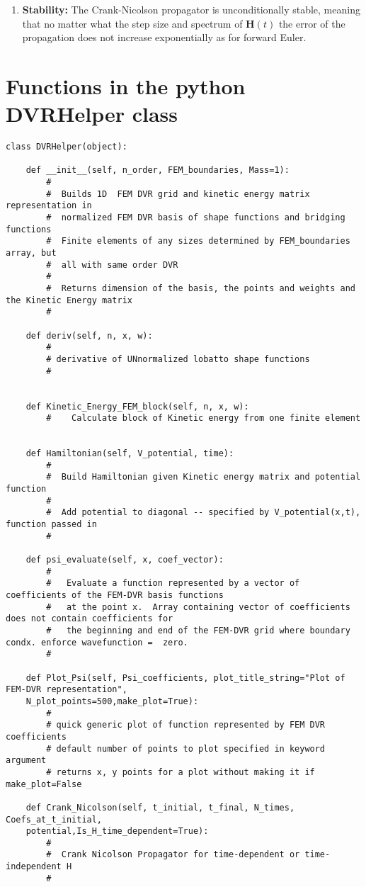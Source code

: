 \documentclass[aps,amssymb,superscriptaddress,floatfix]{revtex4}
\begin{document}
\begin{enumerate}
\item{\textbf{Stability:}  The Crank-Nicolson propagator is unconditionally stable, meaning that no matter what the step size and spectrum of $\mathbf{H}(t)$ the error of the propagation does not increase exponentially as for forward Euler.} 
\end{enumerate}



\section{Functions in the python DVRHelper class}
\begin{verbatim}
class DVRHelper(object):
    
    def __init__(self, n_order, FEM_boundaries, Mass=1):
        #
        #  Builds 1D  FEM DVR grid and kinetic energy matrix representation in
        #  normalized FEM DVR basis of shape functions and bridging functions
        #  Finite elements of any sizes determined by FEM_boundaries array, but
        #  all with same order DVR
        #
        #  Returns dimension of the basis, the points and weights and the Kinetic Energy matrix
        #
        
    def deriv(self, n, x, w):
        #
        # derivative of UNnormalized lobatto shape functions
        #

   
    def Kinetic_Energy_FEM_block(self, n, x, w):
        #    Calculate block of Kinetic energy from one finite element


    def Hamiltonian(self, V_potential, time):
        #
        #  Build Hamiltonian given Kinetic energy matrix and potential function
        #
        #  Add potential to diagonal -- specified by V_potential(x,t), function passed in
        #

    def psi_evaluate(self, x, coef_vector):
        #
        #   Evaluate a function represented by a vector of coefficients of the FEM-DVR basis functions
        #   at the point x.  Array containing vector of coefficients does not contain coefficients for
        #   the beginning and end of the FEM-DVR grid where boundary condx. enforce wavefunction =  zero.
        #

    def Plot_Psi(self, Psi_coefficients, plot_title_string="Plot of FEM-DVR representation",
    N_plot_points=500,make_plot=True):
        #
        # quick generic plot of function represented by FEM DVR coefficients
        # default number of points to plot specified in keyword argument
        # returns x, y points for a plot without making it if make_plot=False

    def Crank_Nicolson(self, t_initial, t_final, N_times, Coefs_at_t_initial,
    potential,Is_H_time_dependent=True):
        #
        #  Crank Nicolson Propagator for time-dependent or time-independent H
        #
\end{verbatim}



\end{document}
